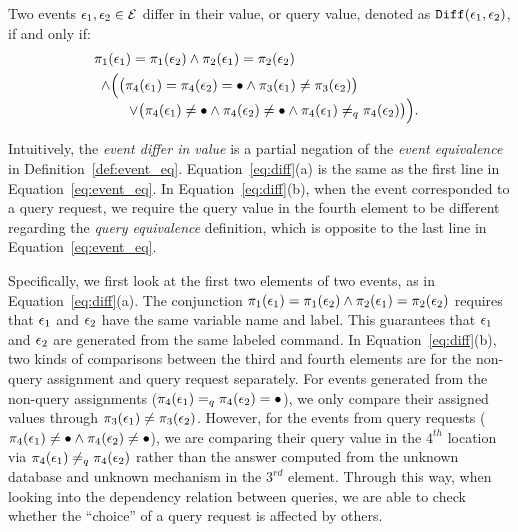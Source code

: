 \begin{defn}
\label{def:diff}
Two events $\mathtt{\epsilon}_1, \mathtt{\epsilon}_2 \in \mathcal{E}$ differ in their value, or query value,
denoted as $\mathtt{Diff}(\mathtt{\epsilon}_1, \mathtt{\epsilon}_2)$, if and only if:
{\small
\begin{subequations}
\begin{align}
& \pi_1(\mathtt{\epsilon}_1) = \pi_1(\mathtt{\epsilon}_2) 
 \land 
 \pi_2(\mathtt{\epsilon}_1) = \pi_2(\mathtt{\epsilon}_2) \\
& 
\begin{array}{l}
 \land 
 \Big(
 \big(\pi_{4}(\mathtt{\epsilon}_1) = \pi_{4}(\mathtt{\epsilon}_2) = \bullet 
 \land 
 \pi_3(\mathtt{\epsilon}_1) \neq \pi_3(\mathtt{\epsilon}_2)
 \big)
 \\ \qquad \lor 
 \big(\pi_4(\mathtt{\epsilon}_1) \neq \bullet
 \land 
 \pi_4(\mathtt{\epsilon}_2) \neq \bullet
 \land 
 \pi_{4}(\mathtt{\epsilon}_1) \neq_q \pi_{4}(\mathtt{\epsilon}_2)
 \big ) 
 \Big).
\end{array}
\end{align}
\label{eq:diff}
\end{subequations}
}
\end{defn}
Intuitively, the \emph{event differ in value} is a partial negation of the \emph{event equivalence} in Definition~\ref{def:event_eq}.
Equation~\ref{eq:diff}(a) is the same as the first line in Equation~\ref{eq:event_eq}.
In Equation~\ref{eq:diff}(b), when the event corresponded to a query request, we require the query value in the fourth element to be different regarding the \emph{query equivalence} definition, which is opposite to the last line in Equation~\ref{eq:event_eq}.

Specifically, we first look at the first two elements of two events,
as in Equation~\ref{eq:diff}(a).
The conjunction $\pi_1(\mathtt{\epsilon}_1) = \pi_1(\mathtt{\epsilon}_2) 
 \land 
 \pi_2(\mathtt{\epsilon}_1) = \pi_2(\mathtt{\epsilon}_2)$ 
requires that $\mathtt{\epsilon}_1$ and $\mathtt{\epsilon}_2$ have the same variable name and label. 
This guarantees that $\mathtt{\epsilon}_1$ and $\mathtt{\epsilon}_2$ are generated from the same labeled command.
In Equation~\ref{eq:diff}(b),
two kinds of comparisons between the third and fourth elements are for the non-query assignment and query request separately.
For events generated from the non-query assignments 
($\pi_{4}(\mathtt{\epsilon}_1) =_q \pi_{4}(\mathtt{\epsilon}_2) = \bullet$), we only compare their assigned values through $\pi_3(\mathtt{\epsilon}_1) \neq \pi_3(\mathtt{\epsilon}_2)$.
However, for the events from query requests 
($\pi_{4}(\mathtt{\epsilon}_1) \neq \bullet \land \pi_{4}(\mathtt{\epsilon}_2) \neq \bullet$),
we are comparing their query value in the $4^{th}$ location via $\pi_{4}(\mathtt{\epsilon}_1) \neq_q \pi_{4}(\mathtt{\epsilon}_2)$ rather than the answer computed from the unknown database and unknown mechanism in the $3^{rd}$ element.
Through this way, when looking into the dependency relation between queries, we are able to check whether the ``choice'' of a query request is affected by others.

